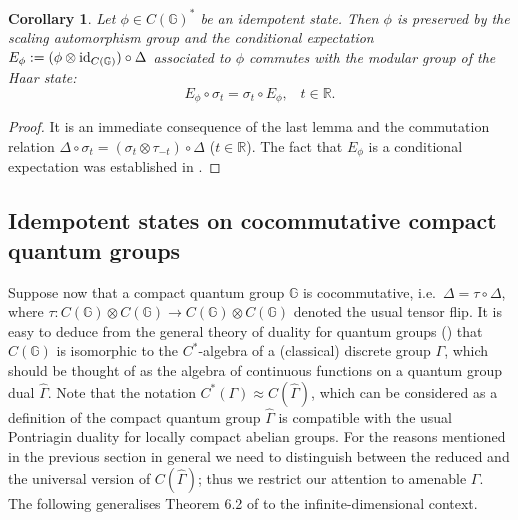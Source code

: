 \documentclass[12pt]{amsart}
\newtheorem{corollary}[theorem]{Corollary}
\theoremstyle{definition}
\theoremstyle{remark}
\numberwithin{equation}{section}
\begin{document}
\begin{corollary}
Let $\phi \in C({\mathbb{G}})^*$ be an idempotent state. Then $\phi$ is preserved by the scaling automorphism group and 
the conditional expectation $E_{\phi}:=(\phi \otimes \textup{id}_{C({\mathbb{G}})}) \circ \Delta$ associated to  $\phi$ 
commutes with the modular group of the Haar state:
\[ E_{\phi} \circ \sigma_t = \sigma_t \circ E_{\phi}, \;\;\; t \in \mathbb{R}.\]
\end{corollary}

\begin{proof}
It is an immediate consequence of the last lemma and the commutation relation $\Delta \circ \sigma_t = (\sigma_t \otimes
\tau_{-t}) \circ \Delta$ ($t \in \mathbb{R}$). The fact that $E_{\phi}$ is a conditional expectation was established in
\cite{franz+skalski09}.
\end{proof}

\subsection{Idempotent states on cocommutative compact quantum groups}

Suppose now that a compact quantum group ${\mathbb{G}}$ is cocommutative, i.e.\ $\Delta = \tau\circ \Delta$, where $\tau: 
C({\mathbb{G}}) \otimes C({\mathbb{G}}) \to C({\mathbb{G}}) \otimes C({\mathbb{G}})$ denoted the usual tensor flip. It is easy to deduce from the 
general theory of duality for quantum groups (\cite{kustermans+vaes00}) that $C({\mathbb{G}})$ is isomorphic to the 
$C^*$-algebra of a (classical) discrete group $\Gamma$, which should be thought of as the algebra of continuous 
functions on a quantum group dual $\hat{\Gamma}$. Note that the notation $C^*(\Gamma) \approx C(\hat{\Gamma})$, 
which can be considered as a definition of the compact quantum group $\hat{\Gamma}$ is compatible with the usual 
Pontriagin duality for locally compact abelian groups. For the reasons mentioned in the previous section in 
general we need to distinguish between the reduced and the universal version of $C(\hat{\Gamma})$; thus we 
restrict our attention to amenable $\Gamma$. The following generalises Theorem 6.2 of \cite{franz+skalski08a} to 
the infinite-dimensional context.
\end{document}
